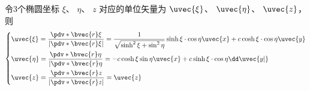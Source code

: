 令3个椭圆坐标 $\xi$、 $\eta$、 $z$ 对应的单位矢量为 $\uvec{\xi}$、 $\uvec{\eta}$、 $\uvec{z}$，则
\begin{equation}
\left\{
    \begin{aligned}
    &\uvec{\xi}=\frac{\pdv*{\bvec{r}}{\xi}}{|\pdv*{\bvec{r}}{\xi}|}=\frac{1}{\sqrt{\sinh^2\xi+\sin^2\eta}}\sinh\xi\cdot\cos\eta\uvec{x}+c\cosh\xi\cdot\cos\eta\uvec{y}\\
    &\uvec{\eta }=\frac{\pdv*{\bvec{r}}{\eta}}{|\pdv*{\bvec{r}}{\eta}}=-c\cosh\xi\sin\eta\uvec{x}+c\sinh\xi\cdot\cos\eta\dd\uvec{y|}\\
    &\uvec{z}=\frac{\pdv*{\bvec{r}}{z}}{|\pdv*{\bvec{r}}{z}|}=\uvec{z}
    \end{aligned}\right.
\end{equation}


